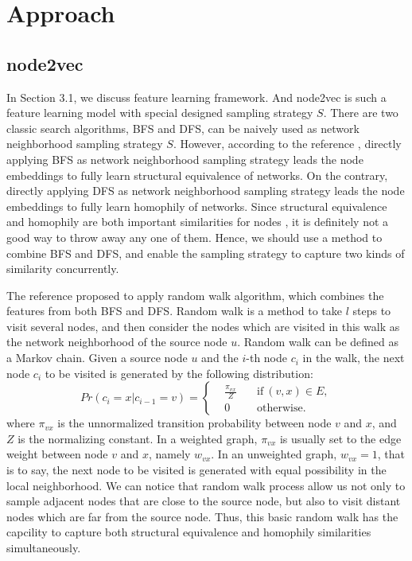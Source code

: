 \documentclass[sigconf]{acmart}
\begin{document}

\section{Approach}

\subsection{node2vec}

In Section 3.1, we discuss feature learning framework. And node2vec is such a feature learning model with special designed sampling strategy $S$. There are two classic search algorithms, BFS and DFS, can be naively used as network neighborhood sampling strategy $S$. However, according to the reference \cite{node2vec}, directly applying BFS as network neighborhood sampling strategy leads the node embeddings to fully learn structural equivalence of networks. On the contrary, directly applying DFS as network neighborhood sampling strategy leads the node embeddings to fully learn homophily of networks. Since structural equivalence and homophily are both important similarities for nodes \cite{mikolov2013distributed}, it is definitely not a good way to throw away any one of them. Hence, we should use a method to combine BFS and DFS, and enable the sampling strategy to capture two kinds of similarity concurrently.

The reference \cite{node2vec} proposed to apply random walk algorithm, which combines the features from both BFS and DFS. Random walk is a method to take $l$ steps to visit several nodes, and then consider the nodes which are visited in this walk as the network neighborhood of the source node $u$. Random walk can be defined as a Markov chain. Given a source node $u$ and the $i$-th node $c_i$ in the walk, the next node $c_i$ to be visited is generated by the following distribution: 
$$Pr(c_i=x|c_{i-1}=v)=\left\{
\begin{aligned}
&\frac{\pi_{vx}}{Z} \quad &\text{if}\ (v,x)\in E, \\
&0 \quad &\text{otherwise.} 
\end{aligned}
\right.$$
where $\pi_{vx}$ is the unnormalized transition probability between node $v$ and $x$, and $Z$ is the normalizing constant. In a weighted graph, $\pi_{vx}$ is usually set to the edge weight between node $v$ and $x$, namely $w_{vx}$. In an unweighted graph, $w_{vx}=1$, that is to say, the next node to be visited is generated with equal possibility in the local neighborhood. We can notice that random walk process allow us not only to sample adjacent nodes that are close to the source node, but also to visit distant nodes which are far from the source node. Thus, this basic random walk has the capcility to capture both structural equivalence and homophily similarities simultaneously. 
\end{document}
